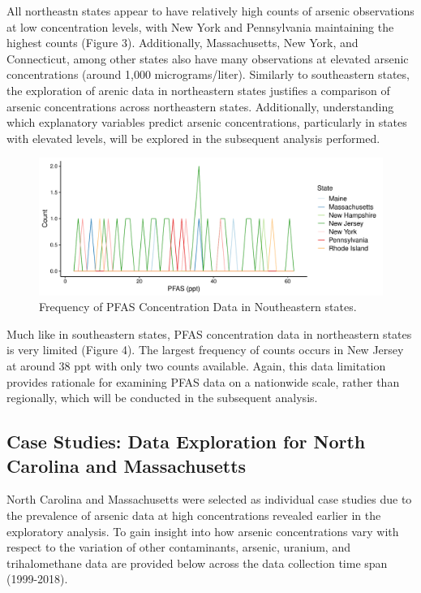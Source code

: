 \documentclass[12pt,]{article}
\begin{document}
All northeastn states appear to have relatively high counts of arsenic
observations at low concentration levels, with New York and Pennsylvania
maintaining the highest counts (Figure 3). Additionally, Massachusetts,
New York, and Connecticut, among other states also have many
observations at elevated arsenic concentrations (around 1,000
micrograms/liter). Similarly to southeastern states, the exploration of
arenic data in northeastern states justifies a comparison of arsenic
concentrations across northeastern states. Additionally, understanding
which explanatory variables predict arsenic concentrations, particularly
in states with elevated levels, will be explored in the subsequent
analysis performed.

\newpage

\begin{figure}
\centering
\includegraphics{Project_Template_files/figure-latex/figs4-1.pdf}
\caption{Frequency of PFAS Concentration Data in Noutheastern states.}
\end{figure}

Much like in southeastern states, PFAS concentration data in
northeastern states is very limited (Figure 4). The largest frequency of
counts occurs in New Jersey at around 38 ppt with only two counts
available. Again, this data limitation provides rationale for examining
PFAS data on a nationwide scale, rather than regionally, which will be
conducted in the subsequent analysis.

\newpage

\hypertarget{case-studies-data-exploration-for-north-carolina-and-massachusetts}{%
\subsection{Case Studies: Data Exploration for North Carolina and
Massachusetts}\label{case-studies-data-exploration-for-north-carolina-and-massachusetts}}

North Carolina and Massachusetts were selected as individual case
studies due to the prevalence of arsenic data at high concentrations
revealed earlier in the exploratory analysis. To gain insight into how
arsenic concentrations vary with respect to the variation of other
contaminants, arsenic, uranium, and trihalomethane data are provided
below across the data collection time span (1999-2018).
\end{document}
